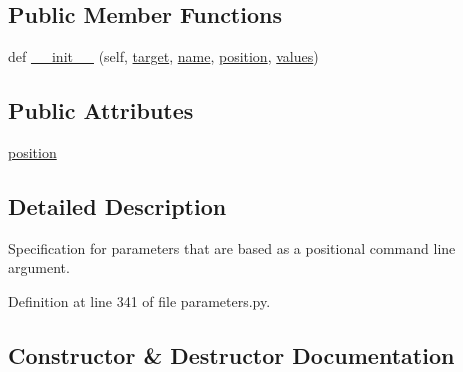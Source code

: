 \subsection*{Public Member Functions}
\begin{DoxyCompactItemize}
\item 
def \hyperlink{classcodar_1_1cheetah_1_1parameters_1_1_param_cmd_line_arg_af01175865438c0b3a065aae0790786f1}{\+\_\+\+\_\+init\+\_\+\+\_\+} (self, \hyperlink{classcodar_1_1cheetah_1_1parameters_1_1_param_a5603d43a20cfc6447c3718406ce0669e}{target}, \hyperlink{classcodar_1_1cheetah_1_1parameters_1_1_param_ac9982d62cd18a368a3fbc26541e14209}{name}, \hyperlink{classcodar_1_1cheetah_1_1parameters_1_1_param_cmd_line_arg_a3fc6c85c37895ee7d710475090562ab8}{position}, \hyperlink{classcodar_1_1cheetah_1_1parameters_1_1_param_aefcc82658f511bddd6605e6ac6e74fbf}{values})
\end{DoxyCompactItemize}
\subsection*{Public Attributes}
\begin{DoxyCompactItemize}
\item 
\hyperlink{classcodar_1_1cheetah_1_1parameters_1_1_param_cmd_line_arg_a3fc6c85c37895ee7d710475090562ab8}{position}
\end{DoxyCompactItemize}


\subsection{Detailed Description}
\begin{DoxyVerb}Specification for parameters that are based as a positional command line
argument.\end{DoxyVerb}
 

Definition at line 341 of file parameters.\+py.



\subsection{Constructor \& Destructor Documentation}
\mbox{\label{classcodar_1_1cheetah_1_1parameters_1_1_param_cmd_line_arg_af01175865438c0b3a065aae0790786f1}} 
